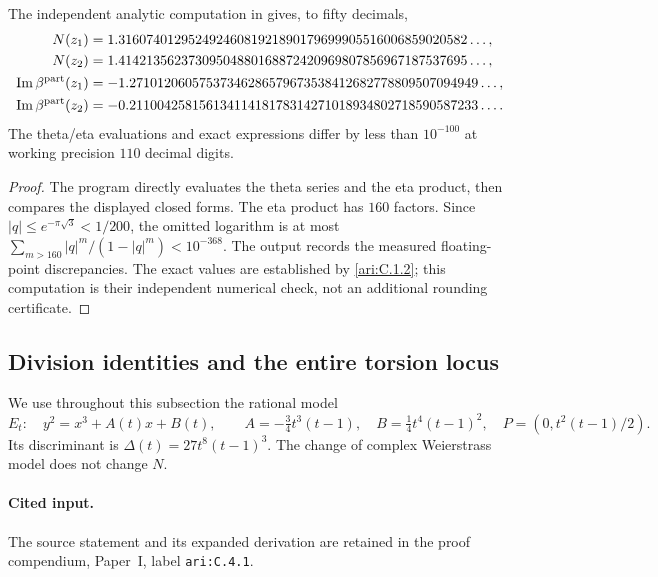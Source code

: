 \begin{proposition}\label{ari:C.1.3}
The independent analytic computation in
 gives, to fifty decimals,
\begin{align*}
 N(z_1)&=1.31607401295249246081921890179699905516006859020582\ldots,\\
 N(z_2)&=1.41421356237309504880168872420969807856967187537695\ldots,\\
 \operatorname{Im}\beta^{\rm part}(z_1)
  &=-1.27101206057537346286579673538412682778809507094949\ldots,\\
 \operatorname{Im}\beta^{\rm part}(z_2)
  &=-0.21100425815613411418178314271018934802718590587233\ldots.
\end{align*}
The theta/eta evaluations and exact expressions differ by less than
$10^{-100}$ at working precision $110$ decimal digits.
\end{proposition}

\begin{proof}
The program directly evaluates the theta series and the eta product,
then compares the displayed closed forms. The eta product has $160$
factors. Since $|q|\le e^{-\pi\sqrt3}<1/200$, the omitted logarithm is
at most $\sum_{m>160}|q|^m/(1-|q|^m)<10^{-368}$.
The output records the measured floating-point discrepancies. The
exact values are established by \ref{ari:C.1.2}; this computation is their
independent numerical check, not an additional rounding certificate.
\end{proof}


\subsection{Division identities and the entire torsion locus}
We use throughout this subsection the rational model
\[
 E_t:\quad y^2=x^3+A(t)x+B(t),\qquad
 A=-\tfrac34t^3(t-1),\quad B=\tfrac14t^4(t-1)^2,
 \quad P=(0,t^2(t-1)/2).
\]
Its discriminant is $\Delta(t)=27t^8(t-1)^3$.
The change of complex Weierstrass model does not change $N$.


\paragraph{Cited input.} \label{ari:C.4.1}The source statement and its expanded derivation are retained in the proof compendium, Paper~I, label \nolinkurl{ari:C.4.1}.\par

